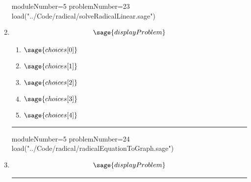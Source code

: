 \documentclass[14pt]{article}
\newcommand{\litem}[1]{\item#1\hspace*{-1cm}\rule{\textwidth}{0.4pt}}
\begin{document}
\begin{enumerate}
\begin{sagesilent}
moduleNumber=5
problemNumber=23
load("../Code/radical/solveRadicalLinear.sage")
\end{sagesilent}

\litem{

\[ \sage{displayProblem} \]

	\begin{enumerate}[label=\Alph*.]
		\item \( \sage{choices[0]} \)
		\item \( \sage{choices[1]} \)
		\item \( \sage{choices[2]} \)
		\item \( \sage{choices[3]} \)
		\item \( \sage{choices[4]} \)
	\end{enumerate}
}

\begin{sagesilent}
moduleNumber=5
problemNumber=24
load("../Code/radical/radicalEquationToGraph.sage")
\end{sagesilent}

\litem{

\[ \sage{displayProblem} \]

}
\end{enumerate}
\end{document}
